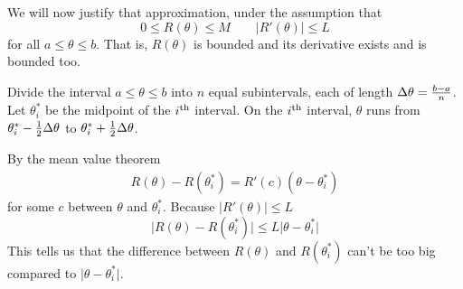 We will now justify that approximation, under the assumption that
\begin{equation*}
0\le R(\theta)\le M \qquad |R'(\theta)|\le L
\end{equation*}
for all $a\le \theta\le b$. That is, $R(\theta)$ is bounded and
its derivative exists and is bounded too.


 Divide the interval $a\le \theta\le b$ into $n$ equal subintervals,
each of length $\Delta\theta=\frac{b-a}{n}$. Let $\theta_i^*$ be the midpoint of
the $i^{\rm th}$ interval. On the $i^{\rm th}$ interval, $\theta$ runs from
$\theta_i^*-\frac{1}{2}\Delta\theta$ to $\theta_i^*+\frac{1}{2}\Delta\theta$. 

By the mean value theorem 
\begin{align*}
R(\theta)-R(\theta_i^*)  = R'(c) (\theta-\theta_i^*)
\end{align*}
for some $c$ between $\theta$ and $\theta_i^*$. Because $|R'(\theta)|\le L$ 
\begin{equation*}
\big|R(\theta)-R(\theta_i^*)\big|  \le L \big|\theta-\theta_i^*\big|
\tag{$*$}
\end{equation*}
This tells us that the difference between $R(\theta)$ and $R(\theta_i^*)$
can't be too big compared to $\big|\theta-\theta_i^*\big|$.

